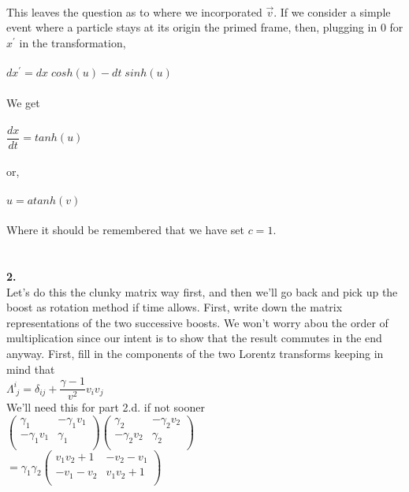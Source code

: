 \documentclass[prb,preprint]
{revtex4-1}
\newcommand{\PRLsep}{\noindent\makebox[\linewidth]{\resizebox{0.8888\linewidth}{2pt}{$\bullet$}}\bigskip}
\begin{document}
\\
This leaves the question as to where we incorporated $\vec{v}$.  If we consider a simple event where a particle stays at its origin the primed frame, then, plugging in $0$ for $x^\prime$ in the transformation, 
\\
\\
$dx^\prime = dx\;cosh\left(u\right) - dt\;sinh\left(u\right)$
\\
\\
We get 
\\
\\
$\dfrac{dx}{dt} = tanh\left(u\right)$
\\
\\
or,
\\
\\
$u = atanh\left(v\right)$
\\
\\
Where it should be remembered that we have set $c = 1$.  
\\
\\
\PRLsep
\\
\newpage
\textbf{2.}
\\
Let's do this the clunky matrix way first, and then we'll go back and pick up the boost as rotation method if time allows.  First, write down the matrix representations of the two successive boosts.  We won't worry abou the order of multiplication since our intent is to show that the result commutes in the end anyway.  First, fill in the components of the two Lorentz transforms keeping in mind that 
\\
$\Lambda^i_{\; j} = \delta_{ij} + \dfrac{\gamma - 1}{v^2} v_i v_j$
\\
We'll need this for part 2.d. if not sooner
\\
$\begin{pmatrix}
\gamma_1 & -\gamma_1 v_1\\
-\gamma_1 v_1 & \gamma_1\\
\end{pmatrix} 
\begin{pmatrix}
\gamma_2 & -\gamma_2 v_2\\
-\gamma_2 v_2 & \gamma_2\\
\end{pmatrix} $
\\
$  = \gamma_1 \gamma_2 
\begin{pmatrix}
v_1 v_2 + 1 & -v_2 - v_1\\
-v_1 - v_2 & v_1 v_2 + 1\\
\end{pmatrix} $
\end{document}
